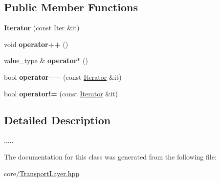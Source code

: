 \subsection*{Public Member Functions}
\begin{DoxyCompactItemize}
\item 
{\bfseries Iterator} (const Iter \&it)\hypertarget{classTransportLayer_1_1Iterator_a4d12b6a4a4876a3b7c0a3affb4f37146}{}\label{classTransportLayer_1_1Iterator_a4d12b6a4a4876a3b7c0a3affb4f37146}

\item 
void {\bfseries operator++} ()\hypertarget{classTransportLayer_1_1Iterator_a5c74990d702e9371d80cde0c4384fd05}{}\label{classTransportLayer_1_1Iterator_a5c74990d702e9371d80cde0c4384fd05}

\item 
value\+\_\+type \& {\bfseries operator$\ast$} ()\hypertarget{classTransportLayer_1_1Iterator_ac8246b2fe036f026793aacc9c9fa22ba}{}\label{classTransportLayer_1_1Iterator_ac8246b2fe036f026793aacc9c9fa22ba}

\item 
bool {\bfseries operator==} (const \hyperlink{classTransportLayer_1_1Iterator}{Iterator} \&it)\hypertarget{classTransportLayer_1_1Iterator_a5229a781d77bbc81d6910f1fa278fbe7}{}\label{classTransportLayer_1_1Iterator_a5229a781d77bbc81d6910f1fa278fbe7}

\item 
bool {\bfseries operator!=} (const \hyperlink{classTransportLayer_1_1Iterator}{Iterator} \&it)\hypertarget{classTransportLayer_1_1Iterator_ae14e34107c22bc4fc54a32652377b4e2}{}\label{classTransportLayer_1_1Iterator_ae14e34107c22bc4fc54a32652377b4e2}

\end{DoxyCompactItemize}


\subsection{Detailed Description}
..... 

The documentation for this class was generated from the following file\+:\begin{DoxyCompactItemize}
\item 
core/\hyperlink{TransportLayer_8hpp}{Transport\+Layer.\+hpp}\end{DoxyCompactItemize}
